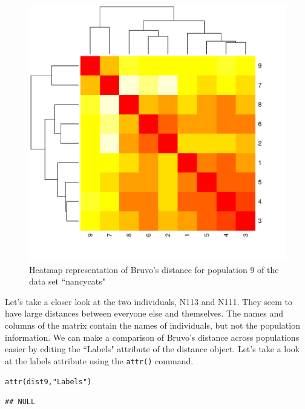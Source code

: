 \documentclass[letterpaper]{article}\usepackage[]{graphicx}\usepackage[]{color}
\makeatletter
\newcommand{\hlstr}[1]{\textcolor[rgb]{0.651,0.522,0}{#1}}%
\newcommand{\hlstd}[1]{\textcolor[rgb]{0,0,0}{#1}}%
\newcommand{\hlkwd}[1]{\textcolor[rgb]{0,0.267,0.4}{#1}}%
\newenvironment{kframe}{%
 \def\at@end@of@kframe{}%
 \ifinner\ifhmode%
  \def\at@end@of@kframe{\end{minipage}}%
  \begin{minipage}{\columnwidth}%
 \fi\fi%
 \def\FrameCommand##1{\hskip\@totalleftmargin \hskip-\fboxsep
 \colorbox{shadecolor}{##1}\hskip-\fboxsep
     \hskip-\linewidth \hskip-\@totalleftmargin \hskip\columnwidth}%
 \MakeFramed {\advance\hsize-\width
   \@totalleftmargin\z@ \linewidth\hsize
   \@setminipage}}%
 {\par\unskip\endMakeFramed%
 \at@end@of@kframe}
\newenvironment{knitrout}{}{} %
\makeatother
\begin{document}
\begin{figure}[h!]
  \centering
  \caption{\footnotesize Heatmap representation of Bruvo's distance for population 9 of the data set ``nancycats"}
  \label{bruvo_heat_map}
\begin{knitrout}\footnotesize
{}\color{fgcolor}

{\centering \includegraphics[width=0.5\linewidth]{figure/unnamed-chunk-9} 

}



\end{knitrout}

\end{figure}

Let's take a closer look at the two individuals, N113 and N111. They seem to have large distances between everyone else and themselves. The names and columns of the matrix contain the names of individuals, but not the population information. We can make a comparison of Bruvo's distance across populations easier by editing the ``Labels" attribute of the distance object. Let's take a look at the labels attribute using the \texttt{attr()} command. 
\begin{knitrout}\footnotesize
{}\color{fgcolor}\begin{kframe}
\begin{alltt}
\hlkwd{attr}\hlstd{(dist9,} \hlstr{"Labels"}\hlstd{)}
\end{alltt}
\begin{verbatim}
## NULL
\end{verbatim}
\end{kframe}
\end{knitrout}
\end{document}
